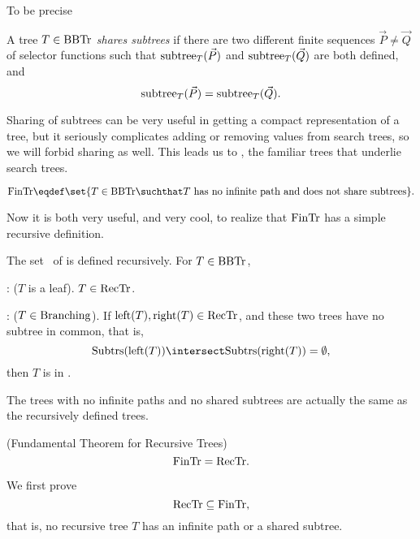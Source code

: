 To be precise
\begin{definition}
A tree $T \in \text{BBTr}$ \emph{shares subtrees} if there are two different
finite sequences $\vec{P} \neq \vec{Q}$ of selector functions such that
$\text{subtree}_{T}(\vec{P})$ and $\text{subtree}_{T}(\vec{Q})$ are both defined, and
\[
\text{subtree}_{T}(\vec{P})=\text{subtree}_{T}(\vec{Q}).
\]
\end{definition}
Sharing of subtrees can be very useful in getting a compact
representation of a tree, but it seriously complicates adding or
removing values from search trees, so we will forbid sharing as well.
This leads us to \fintr, the familiar trees that underlie search
trees.
\begin{definition}
\[
\fintr \eqdef \set{T \in \brnch \suchthat T\ \text{has no infinite path and
  does not share subtrees}}.
\]
\end{definition}

Now it is both very useful, and very cool, to realize that $\text{FinTr}$
has a simple recursive definition.

\begin{definition}
The set \rectr\ of  is defined recursively.  For
$T \in \text{BBTr}$,

: ($T$ is a leaf).  $T \in \text{RecTr}$.

: ($T \in \text{Branching}$).
If $\text{left}(T), \text{right}(T) \in \text{RecTr}$, and these two trees
have no subtree in common, that is,
\[
\subbrn{\leftsub{(T)}} \intersect \subbrn{\rightsub{(T)}} = \emptyset,
\]
then $T$ is in \rectr.
\end{definition}

The trees with no infinite paths and no shared subtrees are actually
the same as the recursively defined trees.

\begin{theorem}\label{fundthmrec}(Fundamental Theorem for Recursive Trees)
\[
\text{FinTr} = \text{RecTr}.
\]
\end{theorem}

We first prove
\begin{equation}\label{rectrsubfintr}
\text{RecTr} \subseteq \text{FinTr},
\end{equation}
that is, no recursive tree $T$ has an infinite path or a shared subtree.

